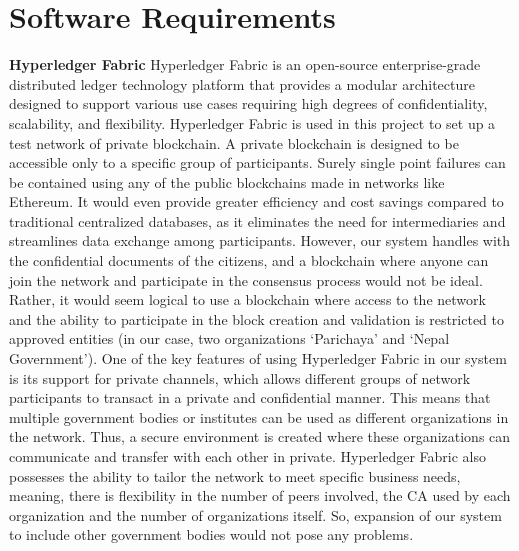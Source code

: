 \section{Software Requirements}

\textbf{Hyperledger Fabric}\newline
  Hyperledger Fabric is an open-source enterprise-grade distributed ledger technology platform that provides a modular architecture designed to support various use cases requiring high degrees of confidentiality, scalability, and flexibility. Hyperledger Fabric is used in this project to set up a test network of private blockchain. A private blockchain is designed to be accessible only to a specific group of participants. Surely single point failures can be contained using any of the public blockchains made in networks like Ethereum. It would even provide greater efficiency and cost savings compared to traditional centralized databases, as it eliminates the need for intermediaries and streamlines data exchange among participants. However, our system handles with the confidential documents of the citizens, and a blockchain where anyone can join the network and participate in the consensus process would not be ideal. Rather, it would seem logical to use a blockchain where access to the network and the ability to participate in the block creation and validation is restricted to approved entities (in our case, two organizations ‘Parichaya’ and ‘Nepal Government’)\cite{manevich2019endorsement}.
One of the key features of using Hyperledger Fabric in our system is its support for private channels, which allows different groups of network participants to transact in a private and confidential manner. This means that multiple government bodies or institutes can be used as different organizations in the network. Thus, a secure environment is created where these organizations can communicate and transfer with each other in private. Hyperledger Fabric also possesses the ability to tailor the network to meet specific business needs, meaning, there is flexibility in the number of peers involved, the CA used by each organization and the number of organizations itself. So, expansion of our system to include other government bodies would not pose any problems. 

